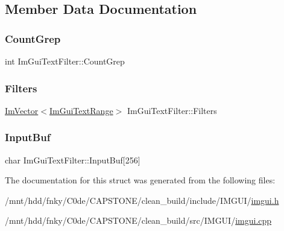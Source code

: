 \subsection{Member Data Documentation}
\mbox{\label{structImGuiTextFilter_ac31839c319fe4211c21fc143b7249f86}} 
\subsubsection{\texorpdfstring{Count\+Grep}{CountGrep}}
{\footnotesize\ttfamily int Im\+Gui\+Text\+Filter\+::\+Count\+Grep}

\mbox{\label{structImGuiTextFilter_a39ed87cfdf3cb0cdb8389b017bb00067}} 
\subsubsection{\texorpdfstring{Filters}{Filters}}
{\footnotesize\ttfamily \hyperlink{structImVector}{Im\+Vector}$<$\hyperlink{structImGuiTextFilter_1_1ImGuiTextRange}{Im\+Gui\+Text\+Range}$>$ Im\+Gui\+Text\+Filter\+::\+Filters}

\mbox{\label{structImGuiTextFilter_ad070acb1038199dd4e8f5d010c5cb5ba}} 
\subsubsection{\texorpdfstring{Input\+Buf}{InputBuf}}
{\footnotesize\ttfamily char Im\+Gui\+Text\+Filter\+::\+Input\+Buf\mbox{[}256\mbox{]}}



The documentation for this struct was generated from the following files\+:\begin{DoxyCompactItemize}
\item 
/mnt/hdd/fnky/\+C0de/\+C\+A\+P\+S\+T\+O\+N\+E/clean\+\_\+build/include/\+I\+M\+G\+U\+I/\hyperlink{imgui_8h}{imgui.\+h}\item 
/mnt/hdd/fnky/\+C0de/\+C\+A\+P\+S\+T\+O\+N\+E/clean\+\_\+build/src/\+I\+M\+G\+U\+I/\hyperlink{imgui_8cpp}{imgui.\+cpp}\end{DoxyCompactItemize}
